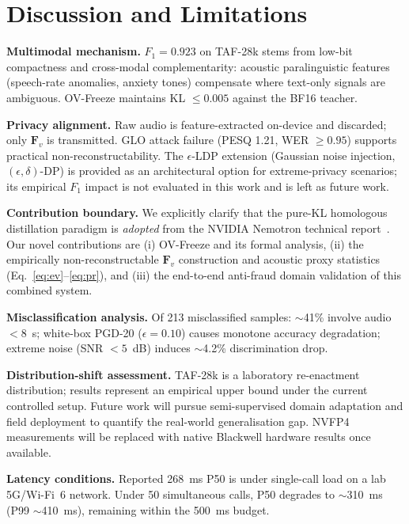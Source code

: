 \documentclass[lettersize,journal]{IEEEtran}
\begin{document}
\section{Discussion and Limitations}
\label{sec:discussion}

\textbf{Multimodal mechanism.}  $F_1=0.923$ on TAF-28k stems from
low-bit compactness and cross-modal complementarity: acoustic
paralinguistic features (speech-rate anomalies, anxiety tones)
compensate where text-only signals are ambiguous.  OV-Freeze
maintains KL $\le 0.005$ against the BF16 teacher.

\textbf{Privacy alignment.}  Raw audio is feature-extracted on-device
and discarded; only $\bm{F}_v$ is transmitted.  GLO attack failure
(PESQ 1.21, WER $\ge 0.95$) supports practical non-reconstructability.
The $\epsilon$-LDP extension (Gaussian noise injection,
$(\epsilon,\delta)$-DP) is provided as an architectural option for
extreme-privacy scenarios; its empirical $F_1$ impact is not
evaluated in this work and is left as future work.

\textbf{Contribution boundary.}  We explicitly clarify that the
pure-KL homologous distillation paradigm is \emph{adopted} from the
NVIDIA Nemotron technical report~\cite{3}.  Our novel contributions
are (i) OV-Freeze and its formal analysis, (ii) the empirically
non-reconstructable $\bm{F}_v$ construction and acoustic proxy
statistics (Eq.~\eqref{eq:ev}--\eqref{eq:pr}), and (iii) the
end-to-end anti-fraud domain validation of this combined system.

\textbf{Misclassification analysis.}  Of 213 misclassified samples:
$\sim$41\% involve audio $<8$~s; white-box PGD-20 ($\epsilon=0.10$)
causes monotone accuracy degradation; extreme noise (SNR $<5$~dB)
induces $\sim$4.2\% discrimination drop.

\textbf{Distribution-shift assessment.}  TAF-28k is a laboratory
re-enactment distribution; results represent an empirical upper bound
under the current controlled setup.  Future work will pursue
semi-supervised domain adaptation and field deployment to quantify
the real-world generalisation gap.  NVFP4 measurements will be
replaced with native Blackwell hardware results once available.

\textbf{Latency conditions.}  Reported 268~ms P50 is under
single-call load on a lab 5G/Wi-Fi~6 network.  Under 50 simultaneous
calls, P50 degrades to $\sim$310~ms (P99 $\sim$410~ms), remaining
within the 500~ms budget.

\end{document}
